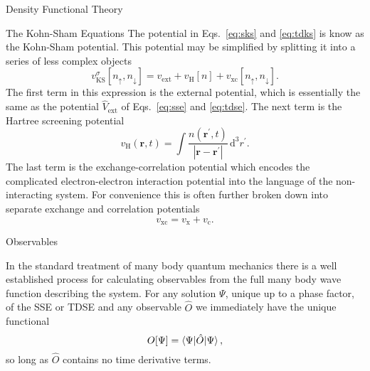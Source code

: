 \documentclass[letterpaper, 12 pt]{report}
\begin{document}
\begin{chapter}{Density Functional Theory \label{chap:dft}}
\begin{section}{The Kohn-Sham Equations \label{sec:ks}}
      The potential in Eqs.\ \eqref{eq:sks} and \eqref{eq:tdks} is know as the Kohn-Sham potential. This
      potential may be simplified by splitting it into a series of less complex objects
      \begin{equation} \label{eq:vks}
         v^\sigma_\mathrm{KS}[n_\uparrow, n_\downarrow] = v_\mathrm{ext} + v_\mathrm{H}[n]
            + v_\mathrm{xc}[n_\uparrow, n_\downarrow].
      \end{equation}
      The first term in this expression is the external potential, which is essentially the same as the
      potential $\hat{V}_\mathrm{ext}$ of Eqs.\ \eqref{eq:sse} and \eqref{eq:tdse}. The next term is
      the Hartree screening potential
      \begin{equation} \label{eq:vh}
         v_\mathrm{H}(\mathbf{r},t) = \int \frac{n(\mathbf{r}^\prime, t)}
            {\left| \mathbf{r} - \mathbf{r}^\prime\right|} \, \mathrm{d}^3 r^\prime.
      \end{equation}
      The last term is the exchange-correlation potential which encodes the complicated
      electron-electron interaction potential into the language of the non-interacting system. For
      convenience this is often further broken down into separate exchange and correlation potentials
      \begin{equation} \label{eq:vxc}
         v_\mathrm{xc} = v_\mathrm{x} + v_\mathrm{c}.
      \end{equation}

   \end{section}

   \begin{section}{Observables \label{sec:obs}}

      In the standard treatment of many body quantum mechanics there is a well established process for
      calculating observables from the full many body wave function describing the system. For any
      solution $\Psi$, unique up to a phase factor, of the SSE or TDSE and any observable $\hat{O}$ we
      immediately have the unique functional
      \begin{equation} \label{eq:obsfunc1}
         O[\Psi] = \braket{\Psi| \hat{O} | \Psi},
      \end{equation}
      so long as $\hat{O}$ contains no time derivative terms.


\end{section}
\end{chapter}
\end{document}
